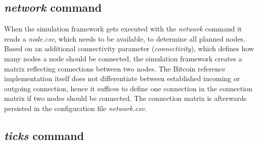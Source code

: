 \subsection{\textit{network} command} \label{chap:network_command}

When the simulation framework gets executed with the \textit{network} command it reads a \textit{node.csv}, which needs to be available, to determine all planned nodes.
Based on an additional connectivity parameter (\textit{connectivity}), which defines how many nodes a node should be connected, the simulation framework creates a matrix reflecting connections between two nodes.
The Bitcoin reference implementation itself does not differentiate between established incoming or outgoing connection, hence it suffices to define one connection in the connection matrix if two nodes should be connected.
The connection matrix is afterwards persisted in the configuration file \textit{network.csv}.

\subsection{\textit{ticks} command} \label{chap:ticks_command}


